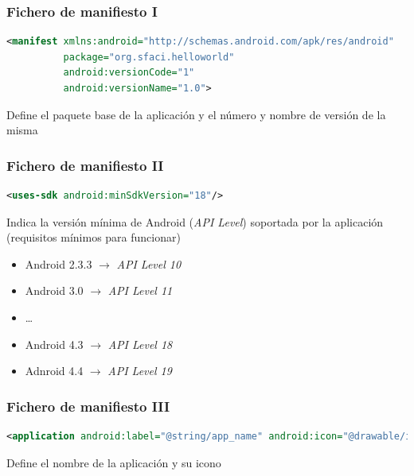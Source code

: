 \documentclass[xcolor={dvipsnames}]{beamer}
\begin{document}
\begin{frame}[fragile]\frametitle{Fichero de manifiesto I}
    \begin{block}{}
    \begin{lstlisting}[language=XML]
<manifest xmlns:android="http://schemas.android.com/apk/res/android"
          package="org.sfaci.helloworld"
          android:versionCode="1"
          android:versionName="1.0">
    \end{lstlisting}
    \end{block}
    \begin{block}{}
    Define el paquete base de la aplicación y el número y nombre de versión de la misma
    \end{block}
\end{frame}

\begin{frame}[fragile]\frametitle{Fichero de manifiesto II}
    \begin{block}{}
    \begin{lstlisting}[language=XML]
<uses-sdk android:minSdkVersion="18"/>
    \end{lstlisting}
    \end{block}
    \begin{block}{}
    Indica la versión mínima de Android (\emph{API Level}) soportada por la aplicación (requisitos mínimos para funcionar)
    \begin{itemize}
        \item Android 2.3.3 $\rightarrow$ \emph{API Level 10}
        \item Android 3.0 $\rightarrow$ \emph{API Level 11}
        \item \ldots
        \item Android 4.3 $\rightarrow$ \emph{API Level 18}
        \item Adnroid 4.4 $\rightarrow$ \emph{API Level 19}
    \end{itemize}
    \end{block}
\end{frame}

\begin{frame}[fragile]\frametitle{Fichero de manifiesto III}
    \begin{block}{}
    \begin{lstlisting}[language=XML]
<application android:label="@string/app_name" android:icon="@drawable/ic_launcher">
    \end{lstlisting}
    \end{block}
    \begin{block}{}
    Define el nombre de la aplicación y su icono
    \end{block}
\end{frame}
\end{document}
